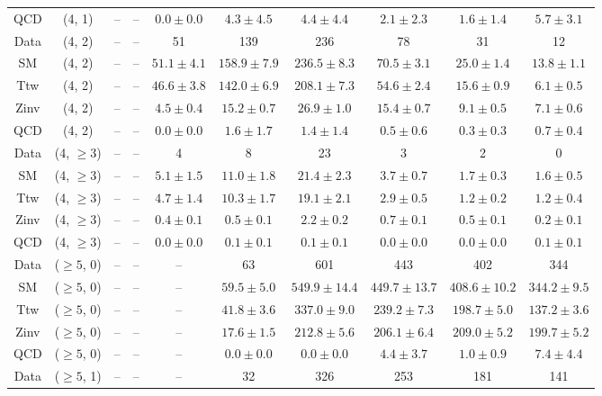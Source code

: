 \begin{table}[h!]
{\begin{tabular}{cccccccccc}
	QCD & (4, 1) & -- & -- & $0.0\pm 0.0$ & $4.3\pm 4.5$ & $4.4\pm 4.4$ & $2.1\pm 2.3$ & $1.6\pm 1.4$ & $5.7\pm 3.1$ \\[0.5ex] 
	Data & (4, 2) & -- & -- & 51 & 139 & 236 & 78 & 31 & 12 \\[0.5ex] 
	SM & (4, 2) & -- & -- & $51.1\pm 4.1$ & $158.9\pm 7.9$ & $236.5\pm 8.3$ & $70.5\pm 3.1$ & $25.0\pm 1.4$ & $13.8\pm 1.1$ \\[0.5ex] 
	Ttw & (4, 2) & -- & -- & $46.6\pm 3.8$ & $142.0\pm 6.9$ & $208.1\pm 7.3$ & $54.6\pm 2.4$ & $15.6\pm 0.9$ & $6.1\pm 0.5$ \\[0.5ex] 
	Zinv & (4, 2) & -- & -- & $4.5\pm 0.4$ & $15.2\pm 0.7$ & $26.9\pm 1.0$ & $15.4\pm 0.7$ & $9.1\pm 0.5$ & $7.1\pm 0.6$ \\[0.5ex] 
	QCD & (4, 2) & -- & -- & $0.0\pm 0.0$ & $1.6\pm 1.7$ & $1.4\pm 1.4$ & $0.5\pm 0.6$ & $0.3\pm 0.3$ & $0.7\pm 0.4$ \\[0.5ex] 
	Data & (4, $\ge3$) & -- & -- & 4 & 8 & 23 & 3 & 2 & 0 \\[0.5ex] 
	SM & (4, $\ge3$) & -- & -- & $5.1\pm 1.5$ & $11.0\pm 1.8$ & $21.4\pm 2.3$ & $3.7\pm 0.7$ & $1.7\pm 0.3$ & $1.6\pm 0.5$ \\[0.5ex] 
	Ttw & (4, $\ge3$) & -- & -- & $4.7\pm 1.4$ & $10.3\pm 1.7$ & $19.1\pm 2.1$ & $2.9\pm 0.5$ & $1.2\pm 0.2$ & $1.2\pm 0.4$ \\[0.5ex] 
	Zinv & (4, $\ge3$) & -- & -- & $0.4\pm 0.1$ & $0.5\pm 0.1$ & $2.2\pm 0.2$ & $0.7\pm 0.1$ & $0.5\pm 0.1$ & $0.2\pm 0.1$ \\[0.5ex] 
	QCD & (4, $\ge3$) & -- & -- & $0.0\pm 0.0$ & $0.1\pm 0.1$ & $0.1\pm 0.1$ & $0.0\pm 0.0$ & $0.0\pm 0.0$ & $0.1\pm 0.1$ \\[0.5ex] 
	Data & ($\ge5$, 0) & -- & -- & -- & 63 & 601 & 443 & 402 & 344 \\[0.5ex] 
	SM & ($\ge5$, 0) & -- & -- & -- & $59.5\pm 5.0$ & $549.9\pm 14.4$ & $449.7\pm 13.7$ & $408.6\pm 10.2$ & $344.2\pm 9.5$ \\[0.5ex] 
	Ttw & ($\ge5$, 0) & -- & -- & -- & $41.8\pm 3.6$ & $337.0\pm 9.0$ & $239.2\pm 7.3$ & $198.7\pm 5.0$ & $137.2\pm 3.6$ \\[0.5ex] 
	Zinv & ($\ge5$, 0) & -- & -- & -- & $17.6\pm 1.5$ & $212.8\pm 5.6$ & $206.1\pm 6.4$ & $209.0\pm 5.2$ & $199.7\pm 5.2$ \\[0.5ex] 
	QCD & ($\ge5$, 0) & -- & -- & -- & $0.0\pm 0.0$ & $0.0\pm 0.0$ & $4.4\pm 3.7$ & $1.0\pm 0.9$ & $7.4\pm 4.4$ \\[0.5ex] 
	Data & ($\ge5$, 1) & -- & -- & -- & 32 & 326 & 253 & 181 & 141 \\[0.5ex] 

\end{tabular}}
\end{table}
